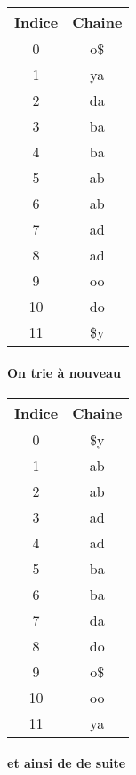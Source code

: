 \begin{tabular}{|c|c|}
    \hline
    Indice & Chaine \\
    \hline
    0 & o\$\\
    \hline
    1 & ya  \\
    \hline
    2 & da\\
    \hline
    3 & ba\\
    \hline
    4 & ba\\
    \hline
    5 & ab\\
    \hline
    6 & ab\\
    \hline
    7 & ad\\
    \hline
    8 & ad\\
    \hline
    9 & oo\\
    \hline
    10 & do\\
    \hline
    11 & \$y\\
    \hline
\end{tabular}

\paragraph{On trie à nouveau}

\begin{tabular}{|c|c|}
    \hline
    Indice & Chaine \\
    \hline
    0 & \$y\\
    \hline
    1 & ab   \\
    \hline
    2 & ab \\
    \hline
    3 & ad\\
    \hline
    4 & ad\\
    \hline
    5 & ba\\
    \hline
    6 & ba\\
    \hline
    7 & da\\
    \hline
    8 & do\\
    \hline
    9 & o\$\\
    \hline
    10 & oo\\
    \hline
    11 & ya\\
    \hline
\end{tabular}

\paragraph{et ainsi de de suite}

